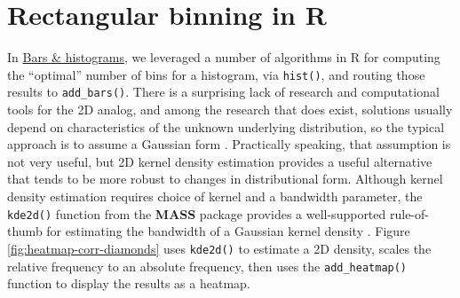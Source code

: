 \documentclass[
  12pt,
]{krantz}
\begin{document}
\hypertarget{rectangular-binning-in-r}{%
\section{Rectangular binning in R}\label{rectangular-binning-in-r}}

In \protect\hyperlink{bars-histograms}{Bars \& histograms}, we leveraged a number of algorithms in R for computing the ``optimal'' number of bins for a histogram, via \texttt{hist()}, and routing those results to \texttt{add\_bars()}. There is a surprising lack of research and computational tools for the 2D analog, and among the research that does exist, solutions usually depend on characteristics of the unknown underlying distribution, so the typical approach is to assume a Gaussian form \citep{mde}. Practically speaking, that assumption is not very useful, but 2D kernel density estimation provides a useful alternative that tends to be more robust to changes in distributional form. Although kernel density estimation requires choice of kernel and a bandwidth parameter, the \texttt{kde2d()} function from the \textbf{MASS} package provides a well-supported rule-of-thumb for estimating the bandwidth of a Gaussian kernel density \citep{MASS}. Figure \ref{fig:heatmap-corr-diamonds} uses \texttt{kde2d()} to estimate a 2D density, scales the relative frequency to an absolute frequency, then uses the \texttt{add\_heatmap()} function to display the results as a heatmap.
\end{document}
